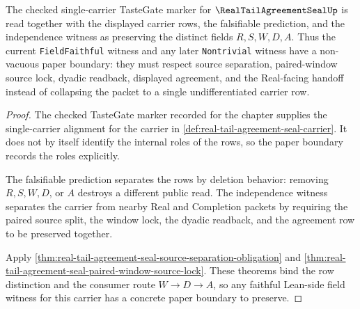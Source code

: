 \begin{theorem}
\label{thm:real-tail-agreement-seal-tastegate-independence-boundary}
The checked single-carrier TasteGate marker for $\RealTailAgreementSealUp$ is read together with the displayed carrier rows, the falsifiable prediction, and the independence witness as preserving the distinct fields $R,S,W,D,A$. Thus the current \texttt{FieldFaithful} witness and any later \texttt{Nontrivial} witness have a non-vacuous paper boundary: they must respect source separation, paired-window source lock, dyadic readback, displayed agreement, and the Real-facing handoff instead of collapsing the packet to a single undifferentiated carrier row.
\end{theorem}
\begin{proof}
The checked TasteGate marker recorded for the chapter supplies the single-carrier alignment for the carrier in \autoref{def:real-tail-agreement-seal-carrier}. It does not by itself identify the internal roles of the rows, so the paper boundary records the roles explicitly.

The falsifiable prediction separates the rows by deletion behavior: removing $R,S,W,D$, or $A$ destroys a different public read. The independence witness separates the carrier from nearby Real and Completion packets by requiring the paired source split, the window lock, the dyadic readback, and the agreement row to be preserved together.

Apply \autoref{thm:real-tail-agreement-seal-source-separation-obligation} and \autoref{thm:real-tail-agreement-seal-paired-window-source-lock}. These theorems bind the row distinction and the consumer route $W \to D \to A$, so any faithful Lean-side field witness for this carrier has a concrete paper boundary to preserve.
\end{proof}

